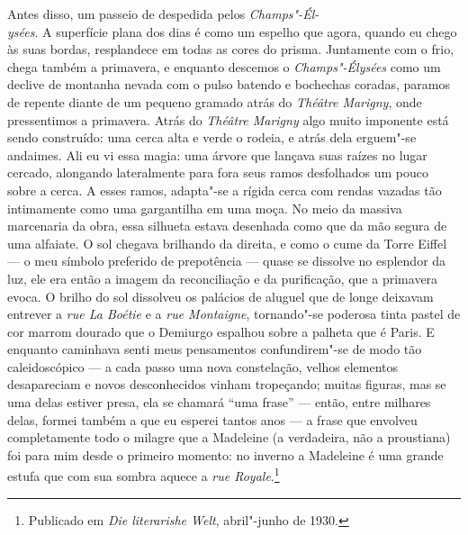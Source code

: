 Antes disso, um passeio de despedida pelos \emph{Champs"-Él-\\ysées}. A superfície
plana dos dias é como um espelho que agora, quando eu chego às suas
bordas, resplandece em todas as cores do prisma. Juntamente com o frio,
chega também a primavera, e enquanto descemos o \emph{Champs"-Élysées} como um
declive de montanha nevada com o pulso batendo e bochechas coradas,
paramos de repente diante de um pequeno gramado atrás do \emph{Théâtre
Marigny}, onde pressentimos a primavera. Atrás do \emph{Théâtre Marigny} algo
muito imponente está sendo construído: uma cerca alta e verde o rodeia,
e atrás dela erguem"-se andaimes. Ali eu vi essa magia: uma árvore que
lançava suas raízes no lugar cercado, alongando lateralmente para fora
seus ramos desfolhados um pouco sobre a cerca. A esses ramos, adapta"-se a
rígida cerca com rendas vazadas tão intimamente como uma gargantilha em
uma moça. No meio da massiva marcenaria da obra, essa silhueta estava
desenhada como que da mão segura de uma alfaiate. O sol chegava
brilhando da direita, e como o cume da Torre Eiffel --- o meu símbolo
preferido de prepotência --- quase se dissolve no esplendor da luz, ele
era então a imagem da reconciliação e da purificação, que a primavera
evoca. O brilho do sol dissolveu os palácios de aluguel que de longe
deixavam entrever a \emph{rue La Boétie} e a \emph{rue Montaigne},
tornando"-se poderosa tinta pastel de cor marrom dourado que o Demiurgo
espalhou sobre a palheta que é Paris. E enquanto caminhava senti meus
pensamentos confundirem"-se de modo tão caleidoscópico --- a cada passo
uma nova constelação, velhos elementos desapareciam e novos
desconhecidos vinham tropeçando; muitas figuras, mas se uma delas
estiver presa, ela se chamará ``uma frase'' --- então, entre milhares
delas, formei também a que eu esperei tantos anos --- a frase que
envolveu completamente todo o milagre que a Madeleine (a verdadeira, não
a proustiana) foi para mim desde o primeiro momento: no inverno a
Madeleine é uma grande estufa que com sua sombra aquece a \emph{rue
Royale}.\footnote{Publicado em \emph{Die literarishe Welt}, abril"-junho de 1930.}
